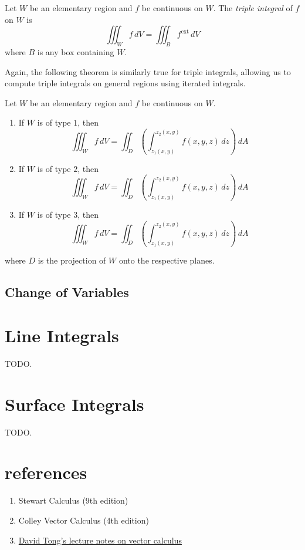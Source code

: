 \documentclass{article}
\begin{document}
\begin{definition}
  Let $W$ be an elementary region and $f$ be continuous on $W$.
  The \emph{triple integral} of $f$ on $W$ is
  \[
    \iiint_W f \, dV = \iiint_B f^{\text{ext}} \, dV
  \]
  where $B$ is any box containing $W$.
\end{definition}
Again, the following theorem is similarly true for triple integrals, allowing us to compute triple integrals on general regions using iterated integrals.
\begin{theorem}
  Let $W$ be an elementary region and $f$ be continuous on $W$.
  \begin{enumerate}
    \item If $W$ is of type $1$, then
          \[
            \iiint_W f \, dV = \iint_D \left( \int_{z_1(x, y)}^{z_2(x, y)} f(x, y, z) \, dz \right) \, dA
          \]
    \item If $W$ is of type $2$, then
          \[
            \iiint_W f \, dV = \iint_D \left( \int_{z_1(x, y)}^{z_2(x, y)} f(x, y, z) \, dz \right) \, dA
          \]
    \item If $W$ is of type $3$, then
          \[
            \iiint_W f \, dV = \iint_D \left( \int_{z_1(x, y)}^{z_2(x, y)} f(x, y, z) \, dz \right) \, dA
          \]
  \end{enumerate}
  where $D$ is the projection of $W$ onto the respective planes.
\end{theorem}

\subsection{Change of Variables}

\section{Line Integrals}

TODO.

\section{Surface Integrals}

TODO.

\section{references}

\begin{enumerate}
  \item Stewart Calculus (9th edition)
  \item Colley Vector Calculus (4th edition)
  \item \href{https://www.damtp.cam.ac.uk/user/tong/vc.html}{David Tong's lecture notes on vector calculus}
\end{enumerate}
\end{document}
